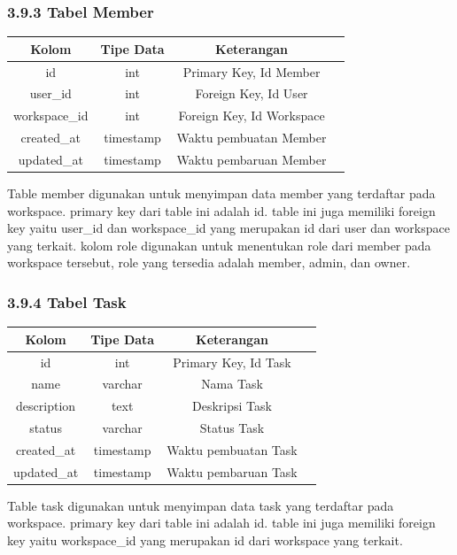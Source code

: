 \subsubsection*{3.9.3	Tabel Member}
\begin{center}
  \begin{tabular}{|c|c|c|c|}
    \hline
    \textbf{Kolom} & \textbf{Tipe Data} & \textbf{Keterangan} \\
    \hline
    id & int & Primary Key, Id Member \\
    user\_id & int & Foreign Key, Id User \\
    workspace\_id & int & Foreign Key, Id Workspace \\
    created\_at & timestamp & Waktu pembuatan Member \\
    updated\_at & timestamp & Waktu pembaruan Member \\
    \hline
  \end{tabular}
\end{center}

Table member digunakan untuk menyimpan data member yang terdaftar pada workspace. primary key dari table ini adalah id.
table ini juga memiliki foreign key yaitu user\_id dan workspace\_id yang merupakan id dari user dan workspace yang terkait.
kolom role digunakan untuk menentukan role dari member pada workspace tersebut, role yang tersedia adalah member, admin, dan owner.

\subsubsection*{3.9.4	Tabel Task}
\begin{center}
  \begin{tabular}{|c|c|c|c|}
    \hline
    \textbf{Kolom} & \textbf{Tipe Data} & \textbf{Keterangan} \\
    \hline
    id & int & Primary Key, Id Task \\
    name & varchar & Nama Task \\
    description & text & Deskripsi Task \\
    status & varchar & Status Task \\
    created\_at & timestamp & Waktu pembuatan Task \\
    updated\_at & timestamp & Waktu pembaruan Task \\
    \hline
  \end{tabular}
\end{center}

Table task digunakan untuk menyimpan data task yang terdaftar pada workspace. primary key dari table ini adalah id.
table ini juga memiliki foreign key yaitu workspace\_id yang merupakan id dari workspace yang terkait.


